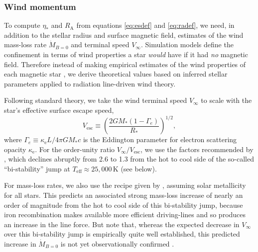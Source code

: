 \documentclass[useAMS,usenatbib]{mn2e}
\newcommand{\etas}{\eta_\ast}
\newcommand{\ra}{R_\mathrm{A}}
\newcommand{\rs}{R_\ast}
\newcommand{\ms}{M_\ast}
\newcommand{\vesc}{V_\mathrm{esc}}
\newcommand{\vinf}{V_\infty}
\newcommand{\mdot}{\dot{M}_{B=0}}
\newcommand{\gae}{\Gamma_e}
\newcommand{\teff}{T_\mathrm{eff}}
\begin{document}
\afterpage{\small \onecolumn \begin{landscape}    \end{landscape} \twocolumn }


\subsubsection{Wind momentum}
\label{sec:mv}


To compute $\etas$ and $\ra$ from equations \ref{eq:esdef} and \ref{eq:radef}, we need, in addition to the stellar radius and surface magnetic field, estimates of the wind mass-loss rate $\mdot $ and terminal speed $\vinf$. Simulation models define the confinement in terms of wind properties a star \textit{would} have if it had \textit{no} magnetic field. 
Therefore instead of making empirical estimates of the wind properties of each magnetic star 
\citep[which are in any case difficult to obtain, see][]{2012MNRAS.423L..21S,2012arXiv1207.6988G}, we derive theoretical values based on inferred stellar parameters applied to radiation line-driven wind theory.

Following standard theory, we take  the wind terminal speed $\vinf$ to scale with the star's effective surface escape speed,
\begin{equation}
	\label{eq:vesc}
	\vesc \equiv  \left(\frac{2G\ms(1-\gae)}{\rs} \right)^{1/2},
\end{equation}
where $\gae \equiv \kappa_\mathrm{e} L/4 \pi G\ms c$ is the Eddington parameter for electron scattering opacity $\kappa_\mathrm{e}$.
For the order-unity ratio $\vinf/\vesc$, we use the factors recommended by \citet{2000A&A...362..295V,2001A&A...369..574V} \citep[based on the empirical study of][]{1995ApJ...455..269L}, which declines abruptly from 2.6 to 1.3 from the hot to cool side of the so-called  ``bi-stability''  jump at $\teff \approx 25,000$\,K (see below).


For mass-loss rates, we also use the recipe given by \citet{2000A&A...362..295V,2001A&A...369..574V}, assuming solar metallicity for all stars.
This predicts an associated strong mass-loss increase of nearly an order of magnitude from the hot to cool side of this bi-stability jump,
because iron recombination makes available more efficient driving-lines and so produces an increase in the line force.
But note that, whereas the expected decrease in $\vinf$ over this bi-stability jump is empirically quite well established, this predicted increase in $\mdot$ is not yet observationally confirmed \citep[e.g.][]{2008A&A...478..823M}.
\end{document}
